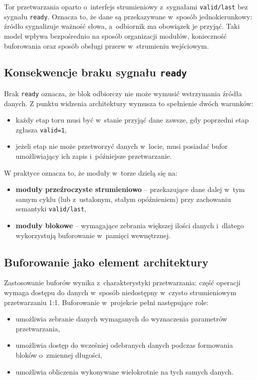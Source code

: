 Tor przetwarzania oparto o~interfejs strumieniowy z~sygnałami \texttt{valid/last} bez sygnału \texttt{ready}. Oznacza to, że dane są przekazywane w~sposób jednokierunkowy: źródło sygnalizuje ważność słowa, a~odbiornik ma obowiązek je przyjąć. Taki model wpływa bezpośrednio na sposób organizacji modułów, konieczność buforowania oraz sposób obsługi przerw w~strumieniu wejściowym.

\subsection{Konsekwencje braku sygnału \texttt{ready}}
Brak \texttt{ready} oznacza, że blok odbiorczy nie może wymusić wstrzymania źródła danych. Z punktu widzenia architektury wymusza to spełnienie dwóch warunków:
\begin{itemize}
    \item każdy etap toru musi być w~stanie przyjąć dane zawsze, gdy poprzedni etap zgłasza \texttt{valid=1},
    \item jeżeli etap nie może przetworzyć danych w~locie, musi posiadać bufor umożliwiający ich zapis i~późniejsze przetwarzanie.
\end{itemize}

W praktyce oznacza to, że moduły w~torze dzielą się na:
\begin{itemize}
    \item \textbf{moduły przeźroczyste strumieniowo} -- przekazujące dane dalej w~tym samym cyklu (lub z~ustalonym, stałym opóźnieniem) przy zachowaniu semantyki \texttt{valid/last},
    \item \textbf{moduły blokowe} -- wymagające zebrania większej ilości danych i~dlatego wykorzystują buforowanie w~pamięci wewnętrznej.
\end{itemize}

\subsection{Buforowanie jako element architektury}
Zastosowanie buforów wynika z~charakterystyki przetwarzania: część operacji wymaga dostępu do danych w~sposób niedostępny w~czysto strumieniowym przetwarzaniu 1:1. Buforowanie w~projekcie pełni następujące role:
\begin{itemize}
    \item umożliwia zebranie danych wymaganych do wyznaczenia parametrów przetwarzania,
    \item umożliwia dostęp do wcześniej odebranych danych podczas formowania bloków o~zmiennej długości,
    \item umożliwia obliczenia wykonywane wielokrotnie na tych samych danych.
\end{itemize}

